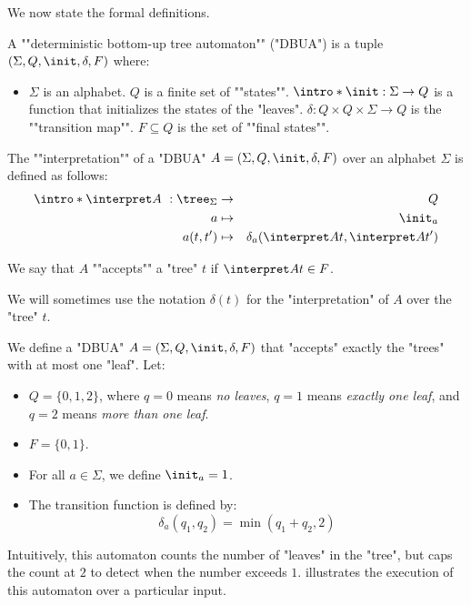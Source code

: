 \documentclass[a4paper,UKenglish,cleveref, autoref, thm-restate]{lipics-v2021}
\begin{document}
We now state the formal definitions.

\begin{definition}
	\AP A ""deterministic bottom-up tree automaton"" (\reintro*"DBUA") is a tuple $(\Sigma, Q, \init, \delta, F)$ where:
	\begin{itemize}
		\item $\Sigma$ is an alphabet.
		      \itemAP $Q$ is a finite set of ""states"".
		      \itemAP $\intro *\init : \Sigma \to Q$ is a function that initializes the states of the "leaves".
		      \itemAP $\delta : Q \times Q \times \Sigma \to Q$ is the ""transition map"". 
		      \itemAP $F \subseteq Q$ is the set of ""final states"".
	\end{itemize}
\end{definition}

\begin{definition}
	\AP The ""interpretation"" of a "DBUA" $A = (\Sigma, Q, \init, \delta, F)$  over an alphabet $\Sigma$ is defined as follows:
	\begin{eqnarray*}
		\intro* \interpret A ~: \tree_{\Sigma} &\to& Q \\
		a &\mapsto& \init_a \\
		a(t,t') &\mapsto& \delta_a (\interpret A t, \interpret A {t'})
	\end{eqnarray*}

	We say that $A$ ""accepts"" a "tree" $t$ if $\interpret A t \in F$.

	We will sometimes use the notation $\delta(t)$ for the "interpretation" of $A$ over the "tree" $t$.
\end{definition}

\begin{example}\label{ex:count-leaves}
	We define a "DBUA" $A = (\Sigma, Q, \init, \delta, F)$ that "accepts" exactly the "trees" with at most one "leaf". Let:
	\begin{itemize}
		\item $Q = \{0,1,2\}$, where $q=0$ means \textit{no leaves}, $q=1$ means \textit{exactly one leaf},
		      and $q=2$ means \textit{more than one leaf}.
		\item $F = \{0,1\}$.
		\item For all $a \in \Sigma$, we define $\init_a = 1$.
		\item The transition function is defined by:
		      \[
			      \delta_a(q_1, q_2) = \min(q_1 + q_2, 2)
		      \]
	\end{itemize}

	Intuitively, this automaton counts the number of "leaves" in the "tree", but caps the count at $2$ to detect when the number exceeds $1$.
	 illustrates the execution of this automaton over a particular input.
\end{example}
\end{document}
